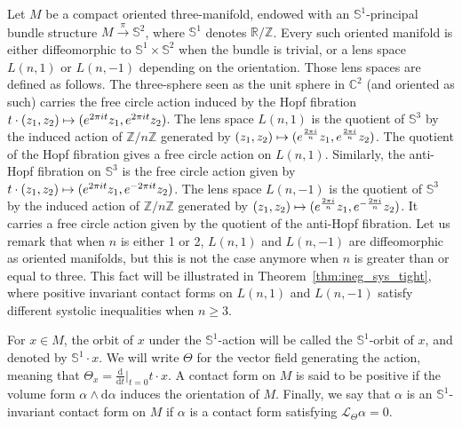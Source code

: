 \documentclass[10pt,a4paper]{amsart}
\newcommand{\bbS}{\mathbb{S}}
\newcommand{\bbZ}{\mathbb{Z}}
\newcommand{\bbR}{\mathbb{R}}
\newcommand{\bbC}{\mathbb{C}}
\newcommand{\clL}{\mathcal{L}}
\newcommand{\rmd}{\mathrm{d}}
\let\oldmapsto\mapsto
\renewcommand*{\mapsto}{\mathchoice{\longmapsto}{\oldmapsto}{\oldmapsto}{\oldmapsto}}
\theoremstyle{definition}\newtheorem{defi}[theo]{Definition}
\begin{document}
Let $M$ be a compact oriented three-manifold, endowed with an $\bbS^1$-principal bundle structure $M \xrightarrow{\pi} \bbS^2$, where $\bbS^1$ denotes $\bbR/\bbZ$. Every such oriented manifold is either diffeomorphic to $\bbS^1 \times \bbS^2$ when the bundle is trivial, or a lens space $L(n,1)$ or $L(n,-1)$ depending on the orientation. Those lens spaces are defined as follows. The three-sphere seen as the unit sphere in $\bbC^2$ (and oriented as such) carries the free circle action induced by the Hopf fibration $t \cdot (z_1,z_2) \mapsto (e^{2 \pi i t}z_1, e^{2 \pi i t}z_2)$. The lens space $L(n,1)$ is the quotient of $\bbS^3$ by the induced action of $\bbZ / n \bbZ$ generated by $(z_1, z_2) \mapsto (e^{\frac{2 \pi i}{n}} z_1, e^{\frac{2 \pi i}{n}} z_2)$. The quotient of the Hopf fibration gives a free circle action on $L(n,1)$. Similarly, the anti-Hopf fibration on $\bbS^3$ is the free circle action given by $t \cdot (z_1,z_2) \mapsto (e^{2 \pi i t}z_1, e^{-2 \pi i t}z_2)$. The lens space $L(n,-1)$ is the quotient of $\bbS^3$ by the induced action of $\bbZ / n \bbZ$ generated by $(z_1, z_2) \mapsto (e^{\frac{2 \pi i}{n}} z_1, e^{-\frac{2 \pi i}{n}} z_2)$. It carries a free circle action given by the quotient of the anti-Hopf fibration. Let us remark that when $n$ is either 1 or 2, $L(n,1)$ and $L(n,-1)$ are diffeomorphic as oriented manifolds, but this is not the case anymore when $n$ is greater than or equal to three. This fact will be illustrated in Theorem~\ref{thm:ineg_sys_tight}, where positive invariant contact forms on $L(n,1)$ and $L(n,-1)$ satisfy different systolic inequalities when $n \geq 3$.

For $x \in M$, the orbit of $x$ under the $\bbS^1$-action will be called the $\bbS^1$-orbit of $x$, and denoted by $\bbS^1\cdot x$. We will write $\Theta$ for the vector field generating the action, meaning that $\Theta_x = \frac{\rmd}{\rmd t}|_{t = 0} t \cdot x$. A contact form on $M$ is said to be positive if the volume form $\alpha \wedge \rmd \alpha$ induces the orientation of $M$. Finally, we say that $\alpha$ is an $\bbS^1$-invariant contact form on $M$ if $\alpha$ is a contact form satisfying $\clL_\Theta \alpha = 0$.
\end{document}
